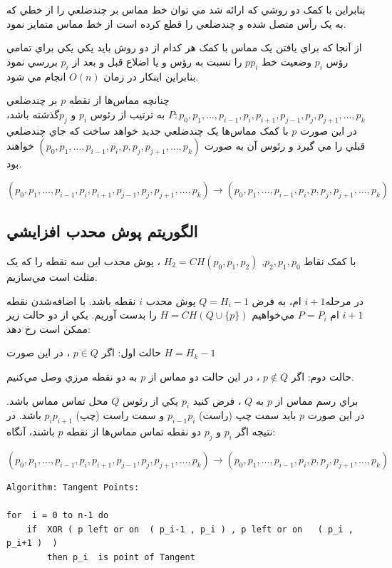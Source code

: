 \documentclass{book}
\begin{document}
بنابراين با کمک دو روشي که ارائه شد مي توان خط مماس بر چندضلعي را از خطي که به يک رأس متصل شده و چندضلعي را قطع کرده است از خط مماس متمايز نمود.

از آنجا که براي يافتن يک مماس با کمک هر کدام از دو روش بايد يکي يکي براي تمامي رؤس‌ $p_i$ وضعيت خط $pp_i$ را نسبت به رؤس و يا اضلاع قبل و بعد از $p_i$ بررسي نمود بنابراين اينکار در زمان $O(n)$   انجام مي شود. 

چنانچه مماس‌ها از نقطه $p$ بر چندضلعي $P:p_0,p_1,…, p_{i-1}, p_i, p_{i+1}, p_{j-1}, p_j, p_{j+1},…,p_k$ به ترتيب از رئوس $p_i$ و  $p_j$گذشته باشد، در اين صورت  $p$ با کمک مماس‌ها يک چندضلعي جديد خواهد ساخت که جاي چندضلعي  قبلي را مي گيرد و رئوس آن به صورت $(p_0,p_1,…, p_{i-1},p_i,p,p_j, p_{j+1},…,p_k)$ خواهند بود.    

$(p_0,p_1,…, p_{i-1}, p_i, p_{i+1}, p_{j-1}, p_j, p_{j+1},…,p_k) \rightarrow (p_0,p_1,…, p_{i-1},p_i,p,p_j, p_{j+1},…,p_k)$

\subsection{الگوريتم پوش محدب افزايشي}

با کمک نقاط  $p_2,  p_1, p_0$, $H_2 = CH(p_0, p_1, p_2)$ ، پوش محدب اين سه نقطه را  که يک مثلث است مي‌سازيم.

در مرحله$i+1$  ام، به فرض $Q=H_i-1$ پوش محدب $i$  نقطه باشد.
با اضافه‌شدن نقطه $i+1$ ام $P=P_i$ مي‌خواهيم $H=CH(Q\cup\{p\})$ را بدست ‌آوريم.
يکي از دو حالت زير ممکن است رخ دهد:

حالت اول: اگر $p \in Q$ ، در اين صورت $H=H_k-1$

حالت دوم: اگر $p \notin Q$ ، در اين حالت دو مماس از $p$ به دو نقطه مرزي وصل مي‌کنيم.

براي رسم مماس از $p$ به $Q$ ، فرض کنيد $p_i$ يکي از رئوس $Q$ محل تماس مماس باشد. در اين صورت $p$ بايد سمت چپ (راست) $p_{i-1}p_i$ و سمت راست (چپ) $p_ip_{i+1}$ باشد. در نتيجه اگر $p_i$ و $p_j$ دو نقطه تماس مماس‌ها از نقطه $p$ باشند، آنگاه:

$(p_0,p_1,…, p_{i-1}, p_i, p_{i+1}, p_{j-1}, p_j, p_{j+1},…,p_k) \rightarrow (p_0,p_1,…, p_{i-1},p_i,p,p_j, p_{j+1},…,p_k)$

\begin{latin}
\begin{verbatim}
Algorithm: Tangent Points:

for  i = 0 to n-1 do
    if  XOR ( p left or on  ( p_i-1 , p_i ) , p left or on   ( p_i , p_i+1 )  )  
        then p_i  is point of Tangent
\end{verbatim}
\end{latin}
\end{document}
